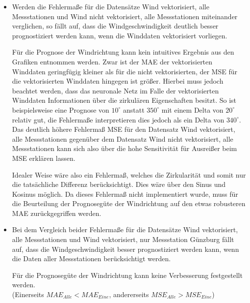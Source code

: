\documentclass[
12pt, %
toc=listofnumbered, %
toc=chapterentrydotfill, %
numbers=noenddot, %
captions=tableheading, %
bibliography=numbered
]{scrreprt}
\newcommand{\qm}[1]{\glqq#1\grqq{}} %
\begin{document}
\begin{itemize}
	\item Werden die Fehlermaße für die Datensätze \qm{Wind vektorisiert, alle Messstationen} und \qm{Wind nicht vektorisiert, alle Messstationen} miteinander verglichen, so fällt auf, dass die Windgeschwindigkeit deutlich besser prognostiziert werden kann, wenn die Winddaten vektorisiert vorliegen. 
	
	Für die Prognose der Windrichtung kann kein intuitives Ergebnis aus den Grafiken entnommen werden. Zwar ist der MAE der vektorisierten Winddaten geringfügig kleiner als für die nicht vektorisierten, der MSE für die vektorisierten Winddaten hingegen ist größer. Hierbei muss jedoch beachtet werden, dass das neuronale Netz im Falle der vektorisierten Winddaten Informationen über die zirkulären Eigenschaften besitzt. So ist beispielsweise eine Prognose von $10^\circ$ anstatt $350^\circ$ mit einem Delta von $20^\circ$ relativ gut, die Fehlermaße interpretieren dies jedoch als ein Delta von $340^\circ$. Das deutlich höhere Fehlermaß MSE für den Datensatz \qm{Wind vektorisiert, alle Messstationen} gegenüber dem Datensatz \qm{Wind nicht vektorisiert, alle Messstationen} kann sich also über die hohe Sensitivität für Ausreißer beim MSE erklären lassen.

	Idealer Weise wäre also ein Fehlermaß, welches die Zirkularität und somit nur die tatsächliche Differenz  berücksichtigt. Dies wäre über den Sinus und Kosinus möglich. Da dieses Fehlermaß nicht implementiert wurde, muss für die Beurteilung der Prognosegüte der Windrichtung auf den etwas robusteren MAE zurückgegriffen werden.

	\item Bei dem Vergleich beider Fehlermaße für die Datensätze \qm{Wind vektorisiert, alle Messstationen} und \qm{Wind vektorisiert, nur Messstation Günzburg} fällt auf, dass die Windgeschwindigkeit besser prognostiziert werden kann, wenn die Daten aller Messstationen berücksichtigt werden. 
	
	Für die Prognosegüte der Windrichtung kann keine Verbesserung festgestellt werden.\\
	(Einerseits $MAE_{Alle} < MAE_{Eine}$, andererseits $MSE_{Alle} > MSE_{Eine}$)
\end{itemize}
\end{document}
